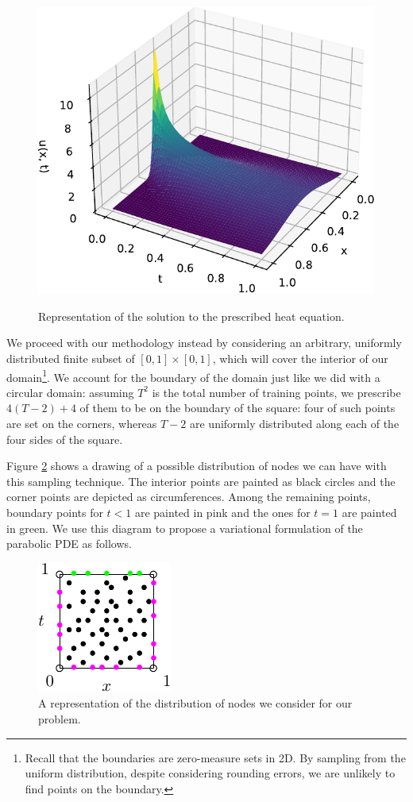 \documentclass[12pt]{report} %
\begin{document}
\begin{figure}
  {\includegraphics[width=.6\textwidth]{cool_graphics/solution-to-heat-equation.pdf}}
  \caption{Representation of the solution to the prescribed heat equation.}
  \label{fig:representation-of-the-solution-to-the-heat-equation}
\end{figure}

We proceed with our methodology instead by considering an arbitrary, uniformly
distributed finite subset of $[0, 1] \times [0, 1]$, which will cover the interior of our domain\footnote{Recall that the boundaries are zero-measure sets in 2D. By sampling from the uniform distribution, despite considering rounding errors, we are unlikely to find points on the boundary.}. We account for the
boundary of the domain just like we did with a circular domain: assuming $T^2$
is the total number of training points, we prescribe $4 (T - 2) + 4$ of them to be on
the boundary of the square: four of such points are set on the corners,
whereas $T - 2$ are uniformly distributed along each of the four sides of the
square.

Figure \ref{fig:representation-domain-problem} shows a drawing of a possible distribution of nodes we can have with this sampling technique. The interior points are painted as black circles and the corner points are depicted as circumferences. Among the remaining points, boundary points for $t<1$ are painted in pink and the ones for $t=1$ are painted in green. We use this diagram to propose a variational formulation of the parabolic PDE as follows.

\begin{figure}
  \includegraphics[width=.3\textwidth]{cool_graphics/cuadrado_dominio_edp_parabolica.pdf}
  \caption{A representation of the distribution of nodes we consider for our problem.}
  \label{fig:representation-domain-problem}
\end{figure}
\end{document}
